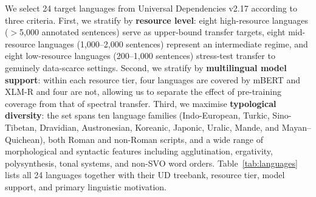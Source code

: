 

We select 24 target languages from Universal Dependencies v2.17
\citep{nivre-etal-2020-universal} according to three criteria.
First, we stratify by \textbf{resource level}: eight high-resource languages
(${>}$5{,}000 annotated sentences) serve as upper-bound transfer targets,
eight mid-resource languages (1{,}000--2{,}000 sentences) represent an
intermediate regime, and eight low-resource languages (200--1{,}000 sentences)
stress-test transfer to genuinely data-scarce settings.
Second, we stratify by \textbf{multilingual model support}: within each resource
tier, four languages are covered by mBERT and XLM-R and four are not,
allowing us to separate the effect of pre-training coverage from that of
spectral transfer.
Third, we maximise \textbf{typological diversity}: the set spans ten language
families (Indo-European, Turkic, Sino-Tibetan, Dravidian, Austronesian,
Koreanic, Japonic, Uralic, Mande, and Mayan--Quichean), both Roman and
non-Roman scripts, and a wide range of morphological and syntactic features
including agglutination, ergativity, polysynthesis, tonal systems, and
non-SVO word orders.
Table~\ref{tab:languages} lists all 24 languages together with their
UD treebank, resource tier, model support, and primary linguistic motivation.


